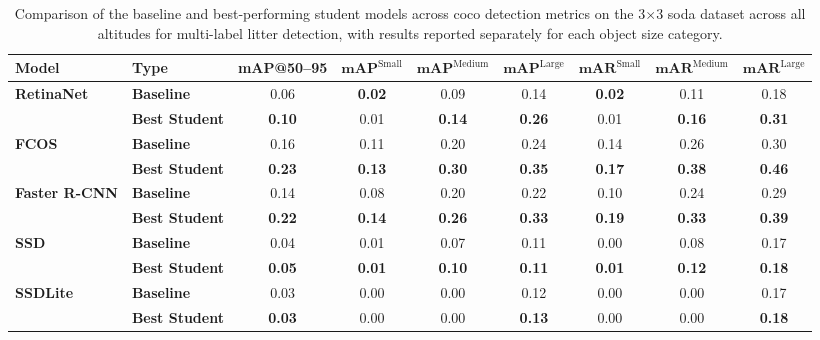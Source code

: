 \begin{table}[htbp]
\centering
\renewcommand{\arraystretch}{1.5} %
\begin{adjustbox}{width=\textwidth}
\begin{tabular}{llccccccc}
\hline
\textbf{Model} & \textbf{Type} & \textbf{mAP@50--95} & \(\mathbf{mAP}^{\text{Small}}\) & \(\mathbf{mAP}^{\text{Medium}}\) & \(\mathbf{mAP}^{\text{Large}}\) & \(\mathbf{mAR}^{\text{Small}}\) & \(\mathbf{mAR}^{\text{Medium}}\) & \(\mathbf{mAR}^{\text{Large}}\) \\ \hline
\multirow{2}{*}{\textbf{RetinaNet}} 
 & \textbf{Baseline}      & 0.06 & \textbf{0.02} & 0.09 & 0.14 & \textbf{0.02} & 0.11 & 0.18 \\
 & \textbf{Best Student}  & \textbf{0.10} & 0.01 & \textbf{0.14} & \textbf{0.26} & 0.01 & \textbf{0.16} & \textbf{0.31} \\ \hline
\multirow{2}{*}{\textbf{FCOS}} 
 & \textbf{Baseline}      & 0.16 & 0.11 & 0.20 & 0.24 & 0.14 & 0.26 & 0.30 \\
 & \textbf{Best Student}  & \textbf{0.23} & \textbf{0.13} & \textbf{0.30} & \textbf{0.35} & \textbf{0.17} & \textbf{0.38} & \textbf{0.46} \\ \hline
\multirow{2}{*}{\textbf{Faster R-CNN}} 
 & \textbf{Baseline}      & 0.14 & 0.08 & 0.20 & 0.22 & 0.10 & 0.24 & 0.29 \\
 & \textbf{Best Student}  & \textbf{0.22} & \textbf{0.14} & \textbf{0.26} & \textbf{0.33} & \textbf{0.19} & \textbf{0.33} & \textbf{0.39} \\ \hline
\multirow{2}{*}{\textbf{SSD}} 
 & \textbf{Baseline}      & 0.04 & 0.01 & 0.07 & 0.11 & 0.00 & 0.08 & 0.17 \\
 & \textbf{Best Student}  & \textbf{0.05} & \textbf{0.01} & \textbf{0.10} & \textbf{0.11} & \textbf{0.01} & \textbf{0.12} & \textbf{0.18} \\ \hline
\multirow{2}{*}{\textbf{SSDLite}} 
 & \textbf{Baseline}      & 0.03 & 0.00 & 0.00 & 0.12 & 0.00 & 0.00 & 0.17 \\
 & \textbf{Best Student}  & \textbf{0.03} & 0.00 & 0.00 & \textbf{0.13} & 0.00 & 0.00 & \textbf{0.18} \\ \hline
\end{tabular}
\end{adjustbox}
\caption{Comparison of the baseline and best‐performing student models across \gls{coco} detection metrics on the 3$\times$3 \gls{soda} dataset across all altitudes for multi-label litter detection, with results reported separately for each object size category.}
\label{tab:soda_tiled_multi_object_sizes_split}
\end{table}

